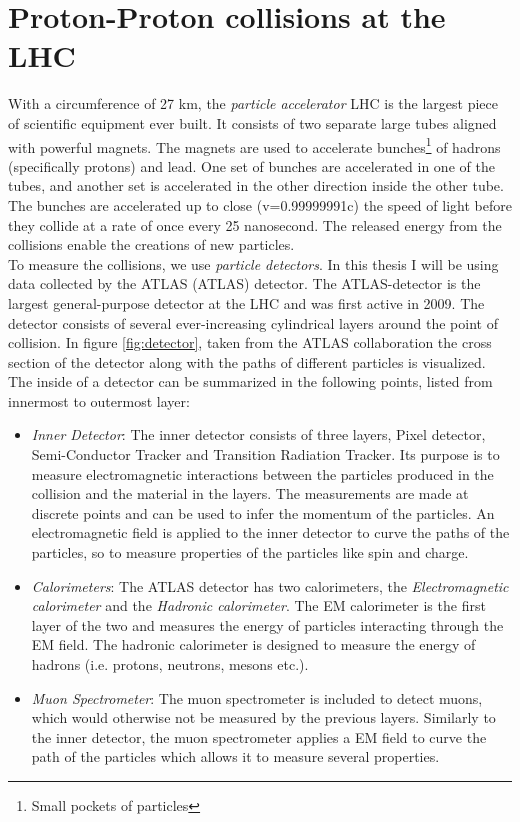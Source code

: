 \section{Proton-Proton collisions at the LHC}
With a circumference of 27 km, the \emph{particle accelerator} \ac{LHC} is the largest piece of scientific 
equipment ever built. It consists of two separate large tubes aligned with powerful magnets. The magnets are used 
to accelerate bunches\footnote{Small pockets of particles} of hadrons (specifically protons) and lead. One set 
of bunches are accelerated in one of the tubes, and another set is accelerated in the other direction inside the 
other tube. The bunches are accelerated up to close (v=0.99999991c) the speed of light before they collide at a 
rate of once every 25 nanosecond. The released energy from the collisions enable the creations of new particles.
\\
To measure the collisions, we use \emph{particle detectors}. In this thesis I will be using data collected by the 
\acs{ATLAS} (\acl{ATLAS}) detector. The \ac{ATLAS}-detector is the largest general-purpose detector at the \ac{LHC}
and was first active in 2009. The detector consists of several ever-increasing cylindrical layers around the point of 
collision. In figure \ref{fig:detector}, taken from the \ac{ATLAS} collaboration \cite{PDetector} the cross section 
of the detector along with the paths of different particles is visualized. The inside of a detector can be summarized 
in the following points, listed from innermost to outermost layer:
\begin{itemize}
    \item \emph{Inner Detector}: The inner detector consists of three layers, Pixel detector, Semi-Conductor Tracker 
          and Transition Radiation Tracker. Its purpose is to measure electromagnetic interactions between the particles 
          produced in the collision and the material in the layers. The measurements are made at discrete points and can be 
          used to infer the momentum of the particles. An electromagnetic field is applied to the inner detector
          to curve the paths of the particles, so to measure properties of the particles like spin and charge.  
    \item \emph{Calorimeters}: The ATLAS detector has two calorimeters, the \emph{Electromagnetic calorimeter} and the 
           \emph{Hadronic calorimeter}. The \ac{EM} calorimeter is the first layer of the two and measures the energy of 
           particles interacting through the \ac{EM} field. The hadronic calorimeter is designed to measure the energy of 
           hadrons (i.e. protons, neutrons, mesons etc.).
    \item \emph{Muon Spectrometer}: The muon spectrometer is included to detect muons, which would otherwise not be measured 
           by the previous layers. Similarly to the inner detector, the muon spectrometer applies a \ac{EM} field to 
           curve the path of the particles which allows it to measure several properties. 
\end{itemize}
